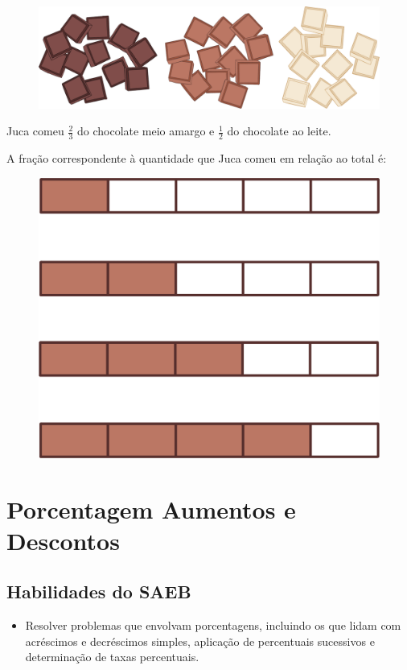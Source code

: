 \begin{figure}[htpb!]
\centering
\includegraphics[width=.5\textwidth]{./ilustras-mat/modulo_3-treino_3.png}
\end{figure}


Juca comeu $\frac{2}{3}$ do chocolate meio amargo e $\frac{1}{2}$ do
chocolate ao leite.

\pagebreak
A fração correspondente à quantidade que Juca comeu em relação ao total é:

\begin{figure}[htpb!]
\includegraphics[width=.5\textwidth]{./ilustras-mat/modulo_3-treino_3_opcoes.png}
\end{figure}

\chapter{Porcentagem Aumentos e Descontos}

\section{Habilidades do SAEB}

\begin{itemize}
  \item Resolver problemas que envolvam porcentagens, incluindo os que 
  lidam com acréscimos e decréscimos simples, aplicação de percentuais
  sucessivos e determinação de taxas percentuais.   
\end{itemize} 

